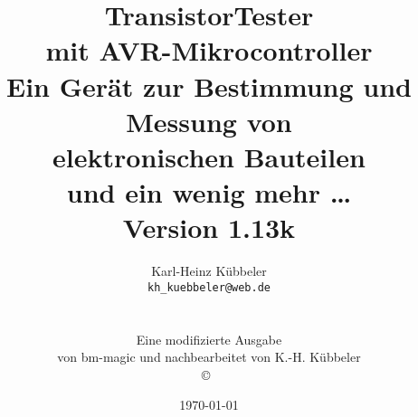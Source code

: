 \documentclass[pdftex,12pt,a4paper,oneside,english]{report}
\begin{document}
\begin{figure}[t]
\end{figure}
\newcommand\electricC{
\hspace{-10pt}
\begin{circuitikz}
\draw(0,0) to[capacitor] (0:1);
\end{circuitikz}
\hspace{-6pt}
}
\newcommand\electricR{
\hspace{-10pt}
\begin{circuitikz}
\draw(0,0) to[european resistor] (0:1);
\end{circuitikz}
\hspace{-6pt}
}
\newcommand\electricL{
\hspace{-10pt}
\begin{circuitikz}
\draw(0,0) 
 to[american inductor] (-1,0);
\end{circuitikz}
\hspace{-6pt}
}
\newcommand\electricDAK{
\begin{circuitikz}
\draw(0,0) to[full diode] (0:1);
\end{circuitikz}
}
\newcommand\electricDKA{
\begin{circuitikz}
\draw(0,0) to[full diode] (180:1);
\end{circuitikz}
}

\title{TransistorTester \\
mit AVR-Mikrocontroller \\
Ein Gerät zur Bestimmung und Messung von\\
elektronischen Bauteilen\\
und ein wenig mehr \dots\\
Version 1.13k \\
}
\author{Karl-Heinz Kübbeler\\
\texttt{kh\_kuebbeler@web.de}
\\
\\
\\
\scriptsize Eine modifizierte Ausgabe\\
\scriptsize von bm-magic und nachbearbeitet von K.-H. Kübbeler\\
\copyright~\\
\vspace*{-0.5cm}
}
\date{\today}
\maketitle
\tableofcontents
\end{document}
